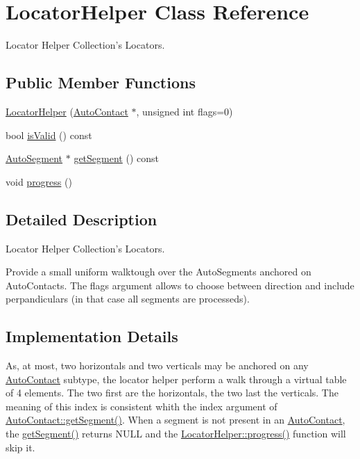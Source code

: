 \hypertarget{classKatabatic_1_1LocatorHelper}{\section{Locator\-Helper Class Reference}
\label{classKatabatic_1_1LocatorHelper}
}


Locator Helper Collection's Locators.  


\subsection*{Public Member Functions}
\begin{DoxyCompactItemize}
\item 
\hyperlink{classKatabatic_1_1LocatorHelper_af44c2fcc73d387e3e3b5c334f25b070b}{Locator\-Helper} (\hyperlink{classKatabatic_1_1AutoContact}{Auto\-Contact} $\ast$, unsigned int flags=0)
\item 
bool \hyperlink{classKatabatic_1_1LocatorHelper_aac1b70a2ed67ead038c4d3f5ac4d8a81}{is\-Valid} () const 
\item 
\hyperlink{classKatabatic_1_1AutoSegment}{Auto\-Segment} $\ast$ \hyperlink{classKatabatic_1_1LocatorHelper_a7da801ed643439613cecc7b0f5d9e0d6}{get\-Segment} () const 
\item 
void \hyperlink{classKatabatic_1_1LocatorHelper_a1be98ae64bededebc29a04f257024ebe}{progress} ()
\end{DoxyCompactItemize}


\subsection{Detailed Description}
Locator Helper Collection's Locators. 

Provide a small uniform walktough over the Auto\-Segments anchored on Auto\-Contacts. The {\ttfamily flags} argument allows to choose between direction and include perpandiculars (in that case all segments are processeds).\hypertarget{classKatabatic_1_1LocatorHelper_secLocHelperImplementation}{}\subsection{Implementation Details}\label{classKatabatic_1_1LocatorHelper_secLocHelperImplementation}
As, at most, two horizontals and two verticals may be anchored on any \hyperlink{classKatabatic_1_1AutoContact}{Auto\-Contact} subtype, the locator helper perform a walk through a virtual table of 4 elements. The two first are the horizontals, the two last the verticals. The meaning of this index is consistent whith the {\ttfamily index} argument of \hyperlink{classKatabatic_1_1AutoContact_a50531ded68cc5206fe104b8d8bf3bd87}{Auto\-Contact\-::get\-Segment()}. When a segment is not present in an \hyperlink{classKatabatic_1_1AutoContact}{Auto\-Contact}, the {\ttfamily \hyperlink{classKatabatic_1_1LocatorHelper_a7da801ed643439613cecc7b0f5d9e0d6}{get\-Segment()}} returns {\ttfamily N\-U\-L\-L} and the \hyperlink{classKatabatic_1_1LocatorHelper_a1be98ae64bededebc29a04f257024ebe}{Locator\-Helper\-::progress()} function will skip it.


